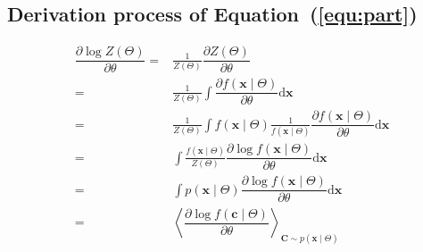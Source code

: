 \documentclass[11pt,twoside,a4paper]{article}
\def\D{\mathrm{d}}
\begin{document}
\begin{appendices}
	\section{Derivation process of Equation~(\ref{equ:part})}
	\label{app:part}
		\begin{equation}
		\begin{aligned}
		 \dfrac{\partial \log Z(\Theta)}{\partial \theta}
		=&\frac{1}{Z(\Theta)}\dfrac{\partial Z(\Theta)}{\partial \theta}\\
		=&\frac{1}{Z(\Theta)} \int \dfrac{\partial f(\mathbf{x} \mid \Theta)}{\partial \theta} \D \mathbf{x} \\
		=&\frac{1}{Z(\Theta)} \int f(\mathbf{x} \mid \Theta) \frac{1}{f(\mathbf{x} \mid \Theta)} \dfrac{\partial  f(\mathbf{x} \mid \Theta)}{\partial \theta} \D \mathbf{x}\\
		=& \int \frac{f(\mathbf{x} \mid \Theta) }{Z(\Theta)} \dfrac{\partial \log f(\mathbf{x} \mid \Theta)}{\partial \theta} \D \mathbf{x}\\
		=& \int  p(\mathbf{x} \mid \Theta) \dfrac{\partial \log f(\mathbf{x} \mid \Theta)}{\partial \theta} \D \mathbf{x}\\
		=&\left \langle \dfrac{\partial \log f(\mathbf{c} \mid \Theta)}{\partial \theta}\right \rangle_{\mathbf{C} \sim p(\mathbf{x} \mid \Theta)}
		\end{aligned}
		\end{equation}

\end{appendices}
\end{document}
